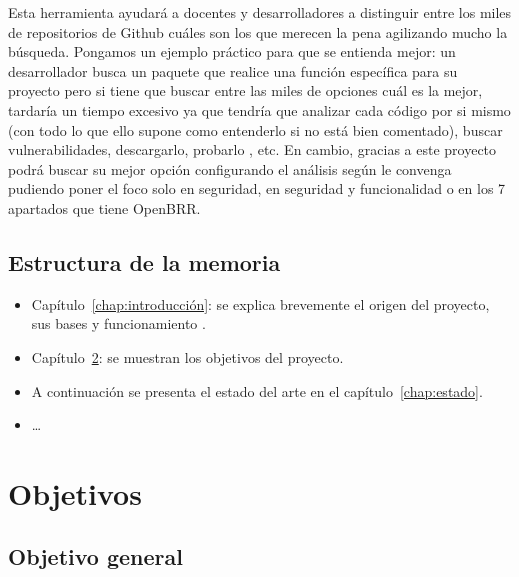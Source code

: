 \documentclass[a4paper, 12pt]{book}
\begin{document}
Esta herramienta ayudará a docentes y desarrolladores a distinguir entre los miles de repositorios de Github cuáles son los que merecen la pena agilizando mucho la búsqueda. Pongamos un ejemplo práctico para que se entienda mejor: un desarrollador busca un paquete
que realice una función específica para su proyecto pero si tiene que buscar entre las miles de opciones cuál es la mejor, tardaría un tiempo excesivo ya que tendría que analizar cada código por si mismo (con todo lo que ello supone como entenderlo si no está bien comentado),
buscar vulnerabilidades, descargarlo, probarlo , etc. En cambio, gracias a este proyecto podrá buscar su mejor opción configurando el análisis según le convenga pudiendo poner el foco solo en seguridad, en seguridad y funcionalidad o en los 7 apartados que tiene OpenBRR.


\section{Estructura de la memoria}
\label{sec:estructura}

\begin{itemize}
  \item Capítulo~\ref{chap:introducción}: se explica brevemente el origen del proyecto, sus bases y funcionamiento .
  
  \item Capítulo~\ref{chap:objetivos}: se muestran los objetivos del proyecto.
  
  \item A continuación se presenta el estado del arte en el capítulo~\ref{chap:estado}.
  
  \item \ldots
\end{itemize}




\cleardoublepage %
\chapter{Objetivos} %
\label{chap:objetivos} %

\section{Objetivo general} %
\label{sec:objetivo-general} %
\end{document}
